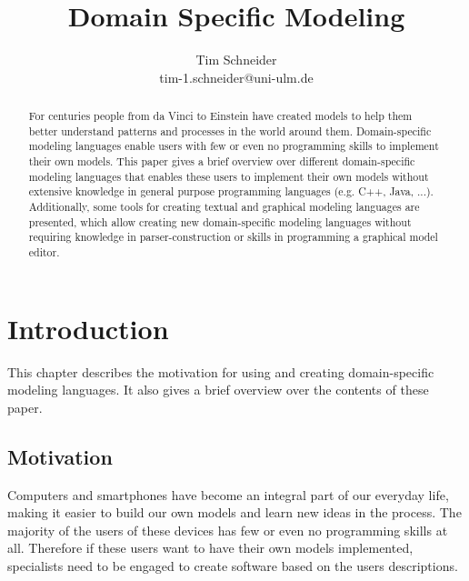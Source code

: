 \documentclass[runningheads,a4paper]{llncs}
\begin{document}
\mainmatter  %

\title{Domain Specific Modeling}



\author{Tim Schneider\\ tim-1.schneider@uni-ulm.de}


\maketitle


\begin{abstract}
For centuries people from da Vinci to Einstein have created models to help them better 
understand patterns and processes in the world around them. 
Domain-specific modeling languages enable users with few or even no programming skills to implement their own models.
This paper gives a  brief overview over different domain-specific modeling languages that enables these users 
to implement their own models without extensive knowledge in general purpose programming languages (e.g. C++, Java, ...).
Additionally, some tools for creating textual and graphical modeling languages are presented, which allow 
creating new domain-specific modeling languages without requiring knowledge in parser-construction or 
skills in programming a graphical model editor.
\end{abstract}

\section{Introduction}
\label{sec:introduction}
This chapter describes the motivation for using and creating domain-specific modeling languages. 
It also gives a brief overview over the contents of these paper.

\subsection{Motivation}
Computers and smartphones have become an integral part of our everyday life, making it easier to build our own models and learn new ideas in the process.
The majority of the users of these devices has few or even no programming skills at all.
Therefore if these users want to have their own models implemented, specialists need to be engaged to create software based on the users descriptions. 
\end{document}
